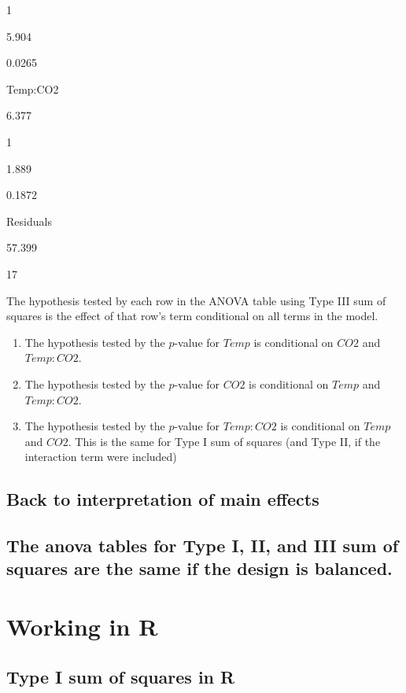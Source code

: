 \documentclass[]{book}
\begin{document}
1

5.904

0.0265

Temp:CO2

6.377

1

1.889

0.1872

Residuals

57.399

17

The hypothesis tested by each row in the ANOVA table using Type III sum
of squares is the effect of that row's term conditional on all terms in
the model.

\begin{enumerate}
\def\labelenumi{\arabic{enumi}.}
\item
  The hypothesis tested by the \(p\)-value for \(Temp\) is conditional
  on \(CO2\) and \(Temp:CO2\).
\item
  The hypothesis tested by the \(p\)-value for \(CO2\) is conditional on
  \(Temp\) and \(Temp:CO2\).
\item
  The hypothesis tested by the \(p\)-value for \(Temp:CO2\) is
  conditional on \(Temp\) and \(CO2\). This is the same for Type I sum
  of squares (and Type II, if the interaction term were included)
\end{enumerate}

\subsection{Back to interpretation of main
effects}\label{back-to-interpretation-of-main-effects}

\subsection{The anova tables for Type I, II, and III sum of squares are
the same if the design is
balanced.}\label{the-anova-tables-for-type-i-ii-and-iii-sum-of-squares-are-the-same-if-the-design-is-balanced.}

\section{Working in R}\label{working-in-r-4}

\subsection{Type I sum of squares in
R}\label{type-i-sum-of-squares-in-r}
\end{document}
